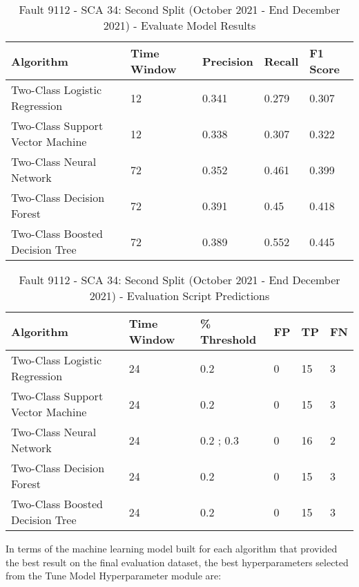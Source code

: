 \begin{table}[!ht]
    \centering
    \begin{tabular}{|l|l|l|l|l|}
    \hline
        Algorithm & Time Window & Precision & Recall & F1 Score \\ \hline
        Two-Class Logistic Regression & 12 & 0.341 & 0.279 & 0.307 \\ \hline
        Two-Class Support Vector Machine & 12 & 0.338 & 0.307 & 0.322 \\ \hline
        Two-Class Neural Network & 72 & 0.352 & 0.461 & 0.399 \\ \hline
        Two-Class Decision Forest & 72 & 0.391 & 0.45 & 0.418 \\ \hline
        Two-Class Boosted Decision Tree & 72 & 0.389 & 0.552 & 0.445 \\ \hline
    \end{tabular}
    \caption{Fault 9112 - SCA 34: Second Split (October 2021 - End December 2021) - Evaluate Model Results}
    \label{9112_SCA34_2nd}
\end{table}

\begin{table}[!ht]
    \centering
    \begin{tabular}{|l|l|l|l|l|l|}
    \hline
        Algorithm & Time Window & \% Threshold & FP & TP & FN \\ \hline
        Two-Class Logistic Regression & 24 & 0.2 & 0 & 15 & 3 \\ \hline
        Two-Class Support Vector Machine & 24 & 0.2 & 0 & 15 & 3 \\ \hline
        Two-Class Neural Network & 24 & 0.2 ; 0.3 & 0 & 16 & 2 \\ \hline
        Two-Class Decision Forest & 24 & 0.2 & 0 & 15 & 3 \\ \hline
        Two-Class Boosted Decision Tree & 24 & 0.2 & 0 & 15 & 3 \\ \hline
    \end{tabular}
	\caption{Fault 9112 - SCA 34: Second Split (October 2021 - End December 2021) - Evaluation Script Predictions}
    \label{9112_SCA34_3rd}
\end{table}

In terms of the machine learning model built for each algorithm that provided the best result on the final evaluation dataset, the best hyperparameters selected from the Tune Model Hyperparameter module are:

